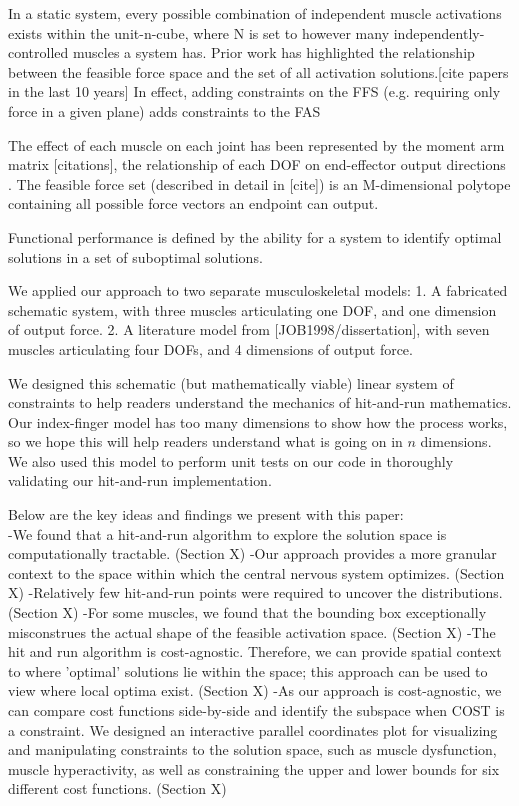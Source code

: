 In a static system, every possible combination of independent muscle activations exists within the unit-n-cube, where N is set to however many independently-controlled muscles a system has.
Prior work has highlighted the relationship between the feasible force space and the set of all activation solutions.[cite papers in the last 10 years]
In effect, adding constraints on the FFS (e.g. requiring only force in a given plane) adds constraints to the FAS

The effect of each muscle on each joint has been represented by the moment arm matrix [citations], the relationship of each DOF on end-effector output directions .
The feasible force set (described in detail in [cite]) is an M-dimensional polytope containing all possible force vectors an endpoint can output.

Functional performance is defined by the ability for a system to identify optimal solutions in a set of suboptimal solutions. 

We applied our approach to two separate musculoskeletal models:
1. A fabricated schematic system, with three muscles articulating one DOF, and one dimension of output force.
2. A literature model from [JOB1998/dissertation], with seven muscles articulating four DOFs, and 4 dimensions of output force.

We designed this schematic (but mathematically viable) linear system of constraints to help readers understand the mechanics of hit-and-run mathematics. Our index-finger model has too many dimensions to show how the process works, so we hope this will help readers understand what is going on in $n$ dimensions. We also used this model to perform unit tests on our code in thoroughly validating our hit-and-run implementation.

Below are the key ideas and findings we present with this paper:\\

-We found that a hit-and-run algorithm to explore the solution space is computationally tractable. (Section X)
-Our approach provides a more granular context to the space within which the central nervous system optimizes. (Section X)
-Relatively few hit-and-run points were required to uncover the distributions. (Section X)
-For some muscles, we found that the bounding box exceptionally misconstrues the actual shape of the feasible activation space. (Section X)
-The hit and run algorithm is cost-agnostic. Therefore, we can provide spatial context to where 'optimal' solutions lie within the space; this approach can be used to view where local optima exist. (Section X)
-As our approach is cost-agnostic, we can compare cost functions side-by-side and identify the subspace when COST is a constraint. We designed an interactive parallel coordinates plot for visualizing and manipulating constraints to the solution space, such as muscle dysfunction, muscle hyperactivity, as well as constraining the upper and lower bounds for six different cost functions. (Section X)

